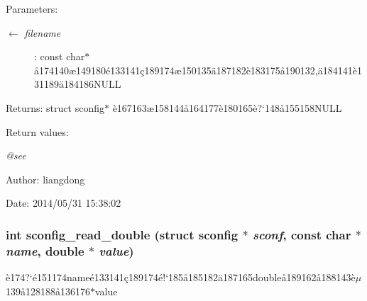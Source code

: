 \begin{Desc}
\item[Parameters:]
\begin{description}
\item[\mbox{$\leftarrow$} {\em filename}]: const char$\ast$ \aa{}174140\ae{}149180\'{e}133141\c{c}189174\ae{}150135\"{a}187182\`{e}183175\aa{}190132,\"{a}184141\`{e}131189\"{a}184186NULL \end{description}
\end{Desc}
\begin{Desc}
\item[Returns:]struct sconfig$\ast$ \`{e}167163\ae{}158144\aa{}164177\`{e}180165\`{e}?`148\aa{}155158NULL \end{Desc}
\begin{Desc}
\item[Return values:]
\begin{description}
\item[{\em @see}]\end{description}
\end{Desc}
\begin{Desc}
\item[Author:]liangdong \end{Desc}
\begin{Desc}
\item[Date:]2014/05/31 15:38:02 \end{Desc}
\subsubsection{\setlength{\rightskip}{0pt plus 5cm}int sconfig\_\-read\_\-double (struct sconfig $\ast$ {\em sconf}, const char $\ast$ {\em name}, double $\ast$ {\em value})}\label{sconfig_8c_a11}


\`{e}174?`\'{e}151174name\'{e}133141\c{c}189174\'{e}!`185\aa{}185182\"{a}187165double\aa{}189162\aa{}188143\`{e}$\mu$139\aa{}128188\aa{}136176$\ast$value 

